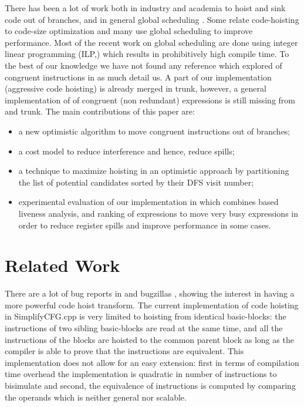 \documentclass[sigplan,10pt,review,anonymous]{acmart}\settopmatter{printfolios=true,printccs=false,printacmref=false}
\begin{document}
There has been a lot of work both in industry and academia to hoist and sink
code out of branches, and in general global scheduling
\cite{click1995global}. Some relate code-hoisting to code-size optimization
\cite{rosen1988global} and many \cite{barany2013, shobaki2013} use global
scheduling to improve performance. Most of the recent work on global scheduling
are done using integer linear programming (ILP,) which results in prohibitively
high compile time. To the best of our knowledge we have not found any reference
which explored \gcm{} of congruent instructions in as much detail us. A part of
our implementation (aggressive code hoisting) is already merged
in \LLVM{} trunk, however, a general implementation of \gcm{} of congruent (non
redundant) expressions is still missing from \GCC{} and \LLVM{} trunk. The main
contributions of this paper are:
\begin{itemize}[leftmargin=*,topsep=0pt]
\item a new optimistic algorithm to move congruent instructions out of branches;
\item a cost model to reduce interference and hence, reduce spills;
\item a technique to maximize hoisting in an optimistic approach by partitioning
  the list of potential candidates sorted by their DFS visit number;
\item experimental evaluation of our implementation in \LLVM{} which combines
  \SSA{} based liveness analysis, and ranking of expressions to move very busy
  expressions in order to reduce register spills and improve performance in some
  cases.
\end{itemize}

\section{Related Work}

There are a lot of bug reports in \GCC{} and \LLVM{} bugzillas
\cite{GCCCodeHoistingBugs, LLVMCodeHoistingBugs}, showing the interest in having
a more powerful code hoist transform.  The current \LLVM{} implementation of
code hoisting in SimplifyCFG.cpp is very limited to hoisting from identical
basic-blocks: the instructions of two sibling basic-blocks are read at the same
time, and all the instructions of the blocks are hoisted to the common parent
block as long as the compiler is able to prove that the instructions are
equivalent.  This implementation does not allow for an easy extension: first in
terms of compilation time overhead the implementation is quadratic in number of
instructions to bisimulate and second, the equivalence of instructions is
computed by comparing the operands which is neither general nor scalable.
\end{document}
